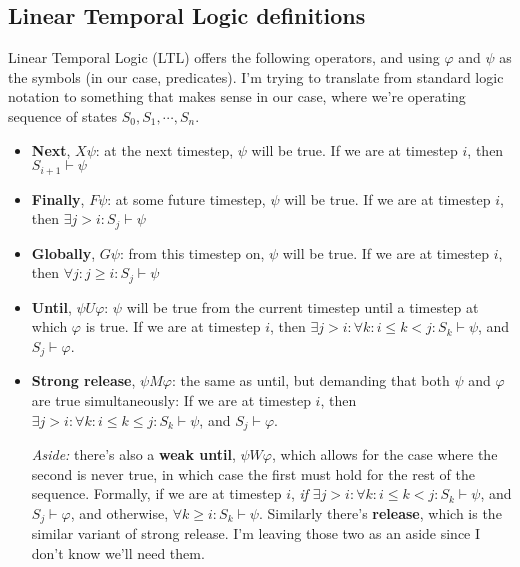 \documentclass{article}
\begin{document}
\subsection{Linear Temporal Logic definitions}
Linear Temporal Logic (LTL) offers the following operators, and using $\varphi$ and $\psi$ as the symbols (in our case, predicates). 
I'm trying to translate from standard logic notation to something that makes sense in our case, where we're operating sequence of states $S_0, S_1, \cdots, S_n$. 
\begin{itemize}
    \item \textbf{Next}, $X \psi$: at the next timestep, $\psi$ will be true. If we are at timestep $i$, then $S_{i+1} \vdash \psi$
    
    \item \textbf{Finally}, $F \psi$: at some future timestep, $\psi$ will be true. If we are at timestep $i$, then $\exists j > i:  S_{j} \vdash \psi$
    
    \item \textbf{Globally}, $G \psi$: from this timestep on, $\psi$ will be true. If we are at timestep $i$, then $\forall j: j \geq i: S_{j} \vdash \psi$
    
    \item \textbf{Until}, $\psi U \varphi$: $\psi$ will be true from the current timestep until a timestep at which $\varphi$ is true. If we are at timestep $i$, then $\exists j > i: \forall k: i \leq k < j: S_k \vdash \psi$, and $S_j \vdash \varphi$.
    \item \textbf{Strong release}, $\psi M \varphi$: the same as until, but demanding that both $\psi$ and $\varphi$ are true simultaneously: If we are at timestep $i$, then $\exists j > i: \forall k: i \leq k \leq j: S_k \vdash \psi$, and $S_j \vdash \varphi$. 
    
    \textit{Aside:} there's also a \textbf{weak until}, $\psi W \varphi$, which allows for the case where the second is never true, in which case the first must hold for the rest of the sequence. Formally, if we are at timestep $i$, \textit{if} $\exists j > i: \forall k: i \leq k < j: S_k \vdash \psi$, and $S_j \vdash \varphi$, and otherwise, $\forall k \geq i: S_k \vdash \psi$. Similarly there's \textbf{release}, which is the similar variant of strong release. I'm leaving those two as an aside since I don't know we'll need them. 
    
\end{itemize}
\end{document}
